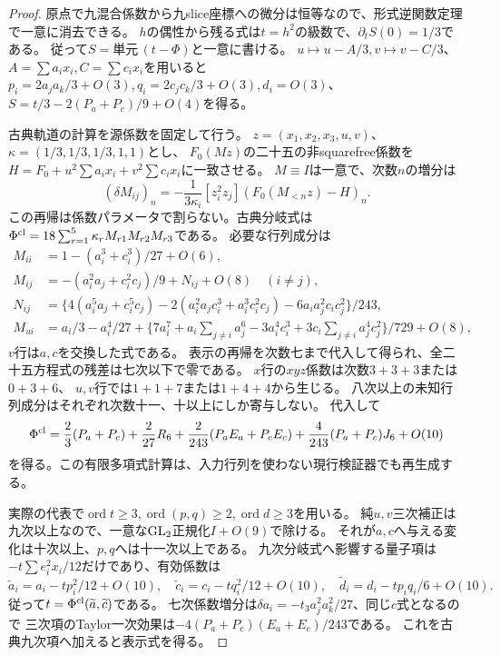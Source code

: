 \begin{proof}
原点で九混合係数から九slice座標への微分は恒等なので、形式逆関数定理で一意に消去できる。
$h$の偶性から残る式は$t=h^2$の級数で、$\partial_tS(0)=1/3$である。
従って$S=\text{単元}\,(t-\Phi)$と一意に書ける。
$u\mapsto u-A/3,v\mapsto v-C/3$、$A=\sum a_ix_i,C=\sum c_ix_i$を用いると
$p_i=2a_ja_k/3+O(3),q_i=2c_jc_k/3+O(3),d_i=O(3)$、
$S=t/3-2(P_a+P_c)/9+O(4)$を得る。

古典軌道の計算を源係数を固定して行う。
$z=(x_1,x_2,x_3,u,v)$、$\kappa=(1/3,1/3,1/3,1,1)$とし、
$F_0(Mz)$の二十五の非squarefree係数を
$H=F_0+u^2\sum a_ix_i+v^2\sum c_ix_i$に一致させる。
$M\equiv I$は一意で、次数$n$の増分は
\[
 (\delta M_{ij})_n=-\frac1{3\kappa_i}[z_i^2z_j](F_0(M_{<n}z)-H)_n.
\]
この再帰は係数パラメータで割らない。古典分岐式は
$\Phi^{\rm cl}=18\sum_{r=1}^5\kappa_rM_{r1}M_{r2}M_{r3}$である。
必要な行列成分は
\begin{align*}
 M_{ii}&=1-(a_i^3+c_i^3)/27+O(6),\\
 M_{ij}&=-(a_i^2a_j+c_i^2c_j)/9+N_{ij}+O(8)\quad(i\ne j),\\
 N_{ij}&=\{4(a_i^5a_j+c_i^5c_j)-2(a_i^2a_jc_i^3+a_i^3c_i^2c_j)
                    -6a_ia_j^2c_ic_j^2\}/243,\\
 M_{ui}&=a_i/3-a_i^4/27+
 \{7a_i^7+a_i\sum_{j\ne i}a_j^6-3a_i^4c_i^3+3c_i\sum_{j\ne i}a_j^4c_j^2\}/729+O(8),
\end{align*}
$v$行は$a,c$を交換した式である。
表示の再帰を次数七まで代入して得られ、全二十五方程式の残差は七次以下で零である。
$x$行の$xyz$係数は次数$3+3+3$または$0+3+6$、
$u,v$行では$1+1+7$または$1+4+4$から生じる。
八次以上の未知行列成分はそれぞれ次数十一、十以上にしか寄与しない。
代入して
\[
 \Phi^{\rm cl}=\frac23(P_a+P_c)+\frac2{27}R_6+
 \frac2{243}(P_aE_a+P_cE_c)+\frac4{243}(P_a+P_c)J_6+O(10)
\]
を得る。この有限多項式計算は、入力行列を使わない現行検証器でも再生成する。

実際の代表で$\operatorname{ord}t\ge3,\operatorname{ord}(p,q)\ge2,\operatorname{ord}d\ge3$を用いる。
純$u,v$三次補正は九次以上なので、一意な$\operatorname{GL}_2$正規化$I+O(9)$で除ける。
それが$a,c$へ与える変化は十次以上、$p,q$へは十一次以上である。
九次分岐式へ影響する量子項は$-t\sum e_i^2x_i/12$だけであり、有効係数は
\[
 \widetilde a_i=a_i-tp_i^2/12+O(10),\quad
 \widetilde c_i=c_i-tq_i^2/12+O(10),\quad
 \widetilde d_i=d_i-tp_iq_i/6+O(10).
\]
従って$t=\Phi^{\rm cl}(\widetilde a,\widetilde c)$である。
七次係数増分は$\delta a_i=-t_3a_j^2a_k^2/27$、同じ$c$式となるので
三次項のTaylor一次効果は$-4(P_a+P_c)(E_a+E_c)/243$である。
これを古典九次項へ加えると表示式を得る。


\end{proof}
